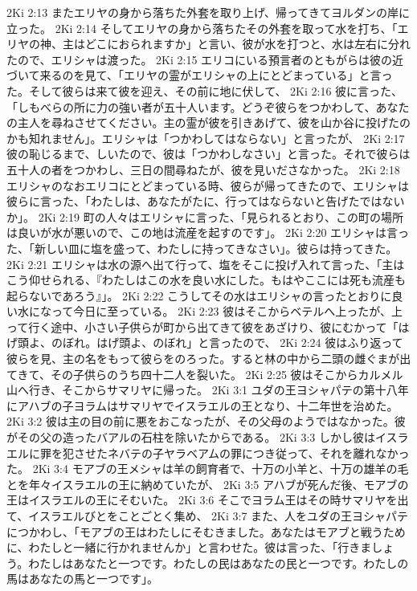 2Ki 2:13  またエリヤの身から落ちた外套を取り上げ、帰ってきてヨルダンの岸に立った。
2Ki 2:14  そしてエリヤの身から落ちたその外套を取って水を打ち、「エリヤの神、主はどこにおられますか」と言い、彼が水を打つと、水は左右に分れたので、エリシャは渡った。
2Ki 2:15  エリコにいる預言者のともがらは彼の近づいて来るのを見て、「エリヤの霊がエリシャの上にとどまっている」と言った。そして彼らは来て彼を迎え、その前に地に伏して、
2Ki 2:16  彼に言った、「しもべらの所に力の強い者が五十人います。どうぞ彼らをつかわして、あなたの主人を尋ねさせてください。主の霊が彼を引きあげて、彼を山か谷に投げたのかも知れません」。エリシャは「つかわしてはならない」と言ったが、
2Ki 2:17  彼の恥じるまで、しいたので、彼は「つかわしなさい」と言った。それで彼らは五十人の者をつかわし、三日の間尋ねたが、彼を見いださなかった。
2Ki 2:18  エリシャのなおエリコにとどまっている時、彼らが帰ってきたので、エリシャは彼らに言った、「わたしは、あなたがたに、行ってはならないと告げたではないか」。
2Ki 2:19  町の人々はエリシャに言った、「見られるとおり、この町の場所は良いが水が悪いので、この地は流産を起すのです」。
2Ki 2:20  エリシャは言った、「新しい皿に塩を盛って、わたしに持ってきなさい」。彼らは持ってきた。
2Ki 2:21  エリシャは水の源へ出て行って、塩をそこに投げ入れて言った、「主はこう仰せられる、『わたしはこの水を良い水にした。もはやここには死も流産も起らないであろう』」。
2Ki 2:22  こうしてその水はエリシャの言ったとおりに良い水になって今日に至っている。
2Ki 2:23  彼はそこからベテルへ上ったが、上って行く途中、小さい子供らが町から出てきて彼をあざけり、彼にむかって「はげ頭よ、のぼれ。はげ頭よ、のぼれ」と言ったので、
2Ki 2:24  彼はふり返って彼らを見、主の名をもって彼らをのろった。すると林の中から二頭の雌ぐまが出てきて、その子供らのうち四十二人を裂いた。
2Ki 2:25  彼はそこからカルメル山へ行き、そこからサマリヤに帰った。
2Ki 3:1  ユダの王ヨシャパテの第十八年にアハブの子ヨラムはサマリヤでイスラエルの王となり、十二年世を治めた。
2Ki 3:2  彼は主の目の前に悪をおこなったが、その父母のようではなかった。彼がその父の造ったバアルの石柱を除いたからである。
2Ki 3:3  しかし彼はイスラエルに罪を犯させたネバテの子ヤラベアムの罪につき従って、それを離れなかった。
2Ki 3:4  モアブの王メシャは羊の飼育者で、十万の小羊と、十万の雄羊の毛とを年々イスラエルの王に納めていたが、
2Ki 3:5  アハブが死んだ後、モアブの王はイスラエルの王にそむいた。
2Ki 3:6  そこでヨラム王はその時サマリヤを出て、イスラエルびとをことごとく集め、
2Ki 3:7  また、人をユダの王ヨシャパテにつかわし、「モアブの王はわたしにそむきました。あなたはモアブと戦うために、わたしと一緒に行かれませんか」と言わせた。彼は言った、「行きましょう。わたしはあなたと一つです。わたしの民はあなたの民と一つです。わたしの馬はあなたの馬と一つです」。
